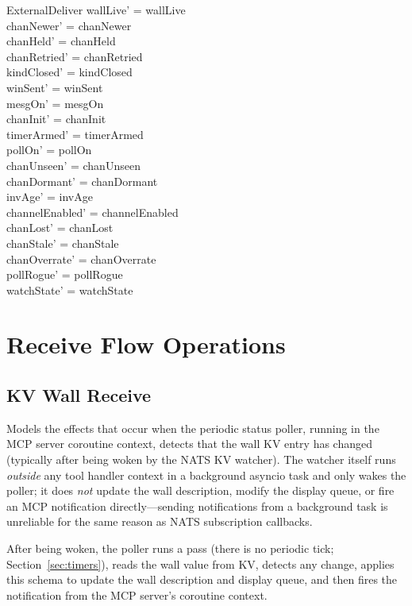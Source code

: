 \documentclass[a4paper,10pt,fleqn]{article}
\begin{document}
\begin{schema}{ExternalDeliver}
  wallLive' = wallLive \\
  chanNewer' = chanNewer \\
  chanHeld' = chanHeld \\
  chanRetried' = chanRetried \\
  kindClosed' = kindClosed \\
  winSent' = winSent \\
  mesgOn' = mesgOn \\
  chanInit' = chanInit \\
  timerArmed' = timerArmed \\
  pollOn' = pollOn \\
  chanUnseen' = chanUnseen \\
  chanDormant' = chanDormant \\
  invAge' = invAge \\
  channelEnabled' = channelEnabled \\
  chanLost' = chanLost \\
  chanStale' = chanStale \\
  chanOverrate' = chanOverrate \\
  pollRogue' = pollRogue \\
  watchState' = watchState
\end{schema}

\section{Receive Flow Operations}

\subsection{KV Wall Receive}

Models the effects that occur when the periodic status poller, running
in the MCP server coroutine context, detects that the wall KV entry
has changed (typically after being woken by the NATS KV watcher).
The watcher itself runs \emph{outside} any tool handler context in a
background asyncio task and only wakes the poller; it does \emph{not}
update the wall description, modify the display queue, or fire an MCP
notification directly---sending notifications from a background task
is unreliable for the same reason as NATS subscription callbacks.

After being woken, the poller runs a pass (there is no periodic tick;
Section~\ref{sec:timers}), reads the wall value from KV, detects any change, applies
this schema to update the wall description and display queue, and then
fires the notification from the MCP server's coroutine context.
\end{document}
